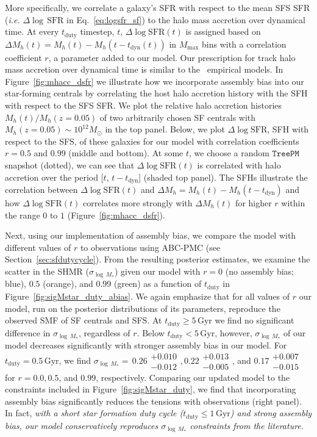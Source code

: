 \documentclass[12pt, letterpaper, preprint, tighten]{aastex62}
\newcommand{\logsfr}{\log\mathrm{SFR}}
\begin{document}
More specifically, we correlate a galaxy's SFR with respect to the mean SFS 
SFR (\emph{i.e.} $\Delta\log\,\mathrm{SFR}$ in Eq.~\ref{eq:logsfr_sf}) to the 
halo mass accretion over dynamical time. At every $t_\mathrm{duty}$ timestep, 
$t$, $\Delta\logsfr(t)$ is assigned based on 
$\Delta M_h(t) = M_h(t) - M_h(t - t_\mathrm{dyn}(t))$ in $M_\mathrm{max}$ bins 
with a correlation coefficient $r$, a parameter added to our model. Our 
prescription for track halo mass accretion over dynamical time is similar to 
the~\cite{rodriguez-puebla2016,behroozi2018} empirical models. In 
Figure~\ref{fig:mhacc_dsfr} we illustrate how we incorporate assembly bias into 
our star-forming centrals by correlating the host halo accretion history 
with the SFH with respect to the SFS SFR. We plot the relative halo
accretion histories $M_h(t)/M_h(z{=}0.05)$ of two arbitrarily chosen SF centrals 
with $M_h(z{=}0.05)\sim10^{12}M_\odot$ in the top panel. Below, we plot 
$\Delta\logsfr$, SFH with respect to the SFS, of these galaxies 
for our model with correlation coefficients $r=0.5$ and $0.99$ (middle and bottom). 
At some $t$, we choose a random $\mathtt{TreePM}$ snapshot (dotted), we can see 
that $\Delta\logsfr(t)$ is correlated with halo accretion over the 
period [$t$, $t - t_\mathrm{dyn}$] (shaded top panel). The SFHs illustrate the
correlation between $\Delta\logsfr(t)$ and 
$\Delta M_h = M_h(t) - M_h(t-t_\mathrm{dyn})$ and how $\Delta\logsfr(t)$
correlates more strongly with $\Delta M_h(t)$ for higher $r$ within the 
range $0$ to $1$ (Figure~\ref{fig:mhacc_dsfr}). 

Next, using our implementation of assembly bias, we compare the model with 
different values of $r$ to observations using ABC-PMC (see Section~\ref{sec:sfdutycycle}). 
From the resulting posterior estimates, we examine the scatter in the SHMR 
($\sigma_{\log\,M_*}$) given our model %
with $r=0$ (no assembly bias; blue), $0.5$ (orange), and $0.99$ (green) as a 
function of $t_\mathrm{duty}$ in Figure~\ref{fig:sigMstar_duty_abias}. We 
again emphasize that for all values of $r$ our model, run on the posterior 
distributions of its parameters, reproduce the observed SMF of SF centrals 
and SFS.  
At $t_\mathrm{duty}{\geq}5\,\mathrm{Gyr}$ we find no significant difference 
in $\sigma_{\log\,M_*}$, regardless of $r$. Below $t_\mathrm{duty} < 5\,\mathrm{Gyr}$, 
however, $\sigma_{\log\,M_*}$ of our model decreases significantly with 
stronger assembly bias in our model. For $t_\mathrm{duty} = 0.5\,\mathrm{Gyr}$, 
{\color{red}
we find $\sigma_{\log\,M_*}{=}\,0.26\substack{+0.010\\-0.012}, 
0.22\substack{+0.013\\-0.005}$, and $0.17\substack{+0.007\\-0.015} $ 
}
for $r{=}0.0, 0.5$, and 
$0.99$, respectively. Comparing our updated model to the constraints included 
in Figure~\ref{fig:sigMstar_duty}, we find that incorporating assembly bias 
significantly reduces the tensions with observations (right panel). In fact, 
\emph{with a short star formation duty cycle ($t_\mathrm{duty} \leq 1\,\mathrm{Gyr}$) 
and strong assembly bias, our model conservatively reproduces 
$\sigma_{\log\,M_*}$ constraints from the literature.}
\end{document}
